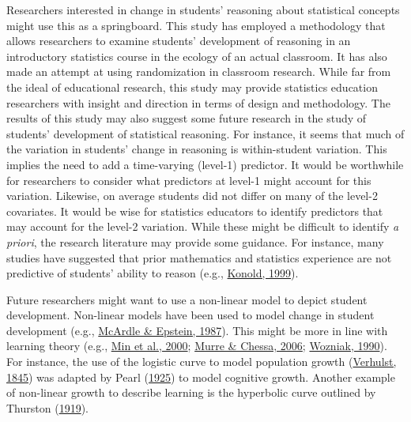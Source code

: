 \documentclass[11pt]{umnthesis}
\begin{document}
Researchers interested in change in students' reasoning about statistical concepts might use this as a springboard. This study has employed a methodology that allows researchers to examine students' development of reasoning in an introductory statistics course in the ecology of an actual classroom. It has also made an attempt at using randomization in classroom research. While far from the ideal of educational research, this study may provide statistics education researchers with insight and direction in terms of design and methodology. The results of this study may also suggest some future research in the study of students' development of statistical reasoning. For instance, it seems that much of the variation in students' change in reasoning is within-student variation. This implies the need to add a time-varying (level-1) predictor. It would be worthwhile for researchers to consider what predictors at level-1 might account for this variation. Likewise, on average students did not differ on many of the level-2 covariates. It would be wise for statistics educators to identify predictors that may account for the level-2 variation. While these might be difficult to identify \emph{a priori}, the research literature may provide some guidance. For instance, many studies have suggested that prior mathematics and statistics experience are not predictive of students' ability to reason (e.g., \protect\hyperlink{ref-konold:1999}{Konold, 1999}).

Future researchers might want to use a non-linear model to depict student development. Non-linear models have been used to model change in student development (e.g., \protect\hyperlink{ref-mcardle:1987}{McArdle \& Epstein, 1987}). This might be more in line with learning theory (e.g., \protect\hyperlink{ref-min:2000}{Min et al., 2000}; \protect\hyperlink{ref-murre:2006}{Murre \& Chessa, 2006}; \protect\hyperlink{ref-wozniak:1990}{Wozniak, 1990}). For instance, the use of the logistic curve to model population growth (\protect\hyperlink{ref-verhulst:1845}{Verhulst, 1845}) was adapted by Pearl (\protect\hyperlink{ref-pearl:1925}{1925}) to model cognitive growth. Another example of non-linear growth to describe learning is the hyperbolic curve outlined by Thurston (\protect\hyperlink{ref-thurston:1919}{1919}).
\end{document}
